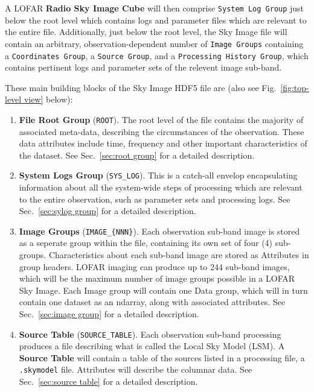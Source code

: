 \documentclass[a4paper,10pt,bibtotoc]{scrartcl}
\begin{document}
A LOFAR \textbf{Radio Sky Image Cube} will then comprise \texttt{System Log Group}
just below the root level which contains logs and parameter files
which are relevant to the entire file. Additionally, just below the
root level, the Sky Image file will contain an arbitrary,
observation-dependent number of \texttt{Image Groups} containing a
\texttt{Coordinates Group}, a \texttt{Source Group}, and a
\texttt{Processing History Group}, which contains pertinent logs and
parameter sets of the relevent image sub-band.

These main building blocks of the Sky Image HDF5 file are (also see
Fig.~\ref{fig:top-level view} below):

\begin{enumerate} \parskip 0pt
\item \textbf{File Root Group} (\verb|ROOT|). The root level of the file contains
  the majority of associated meta-data, describing the circumstances
  of the observation. These data attributes include time, frequency
  and other important characteristics of the dataset. See
  Sec.~\ref{sec:root group} for a detailed description.

\item \textbf{System Logs Group} (\verb|SYS_LOG|). This is a catch-all
  envelop encapsulating information about all the system-wide steps of
  processing which are relevant to the entire observation, such as
  parameter sets and processing logs. See Sec.~\ref{sec:sylog group}
  for a detailed description.

\item \textbf{Image Groups} (\verb|IMAGE_{NNN}|). Each observation
  sub-band image is stored as a seperate group within the file,
  containing its own set of four (4) sub-groups. Characteristics
  about each sub-band image are stored as Attributes in group headers.
  LOFAR imaging can produce up to 244 sub-band images, which will be
  the maximum number of image groups possible in a LOFAR Sky Image.
  Each Image group will contain one Data group, which will in turn
  contain one dataset as an ndarray, along with associated
  attributes. See Sec.~\ref{sec:image group} for a detailed description.

\item \textbf{Source Table} (\verb|SOURCE_TABLE|). Each observation
  sub-band processing produces a file describing what is called the
  Local Sky Model (LSM). A \textbf{Source Table} will contain a
  table of the sources listed in a processing file, a \verb|.skymodel| file.
  Attributes will describe the columnar data. See Sec.~\ref{sec:source
    table} for a detailed description.


\end{enumerate}
\end{document}
